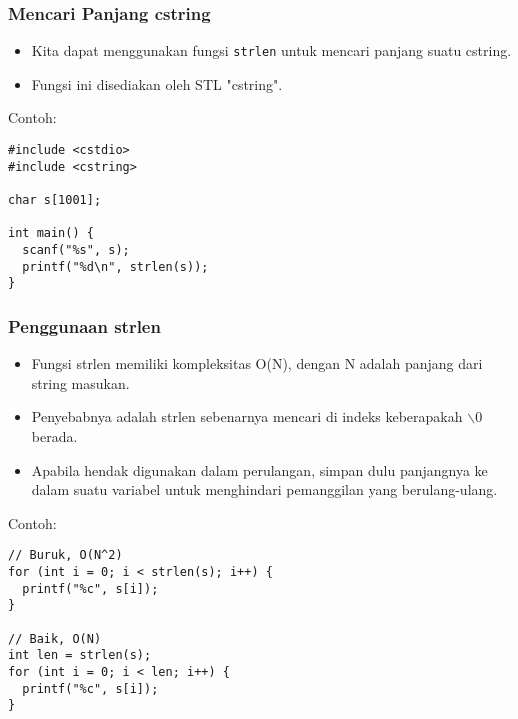 \begin{frame}[fragile]
\frametitle{Mencari Panjang cstring}
\begin{itemize}
  \item Kita dapat menggunakan fungsi \texttt{strlen} untuk mencari panjang suatu cstring.
  \item Fungsi ini disediakan oleh STL "cstring".
\end{itemize}
Contoh:
\begin{lstlisting}
#include <cstdio>
#include <cstring>

char s[1001];

int main() {
  scanf("%s", s);
  printf("%d\n", strlen(s));
}
\end{lstlisting}
\end{frame}

\begin{frame}[fragile]
\frametitle{Penggunaan strlen}
\begin{itemize}
  \item Fungsi strlen memiliki kompleksitas O(N), dengan N adalah panjang dari string masukan.
  \item Penyebabnya adalah strlen sebenarnya mencari di indeks keberapakah $\backslash$0 berada.
  \item Apabila hendak digunakan dalam perulangan, simpan dulu panjangnya ke dalam suatu variabel untuk menghindari pemanggilan yang berulang-ulang.
\end{itemize}
Contoh:
\begin{lstlisting}
// Buruk, O(N^2)
for (int i = 0; i < strlen(s); i++) {
  printf("%c", s[i]);
}

// Baik, O(N)
int len = strlen(s);
for (int i = 0; i < len; i++) {
  printf("%c", s[i]);
}
\end{lstlisting}
\end{frame}


